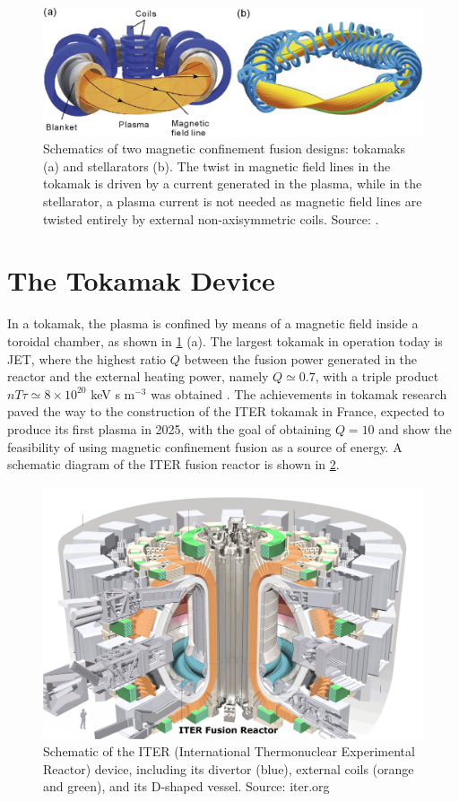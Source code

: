 \begin{figure}
    \centering
    \includegraphics[width=.99\textwidth]{images/tokamak_stellarator.jpg}
    \caption{Schematics of two magnetic confinement fusion designs: tokamaks (a) and stellarators (b). The twist in magnetic field lines in the tokamak is driven by a current generated in the plasma, while in the stellarator, a plasma current is not needed as magnetic field lines are twisted entirely by external non-axisymmetric coils. Source: \citep{Xu2016}.}
    \label{fig:toroidaldevice}
\end{figure}

\section{The Tokamak Device}

In a tokamak, the plasma is confined by means of a magnetic field inside a toroidal chamber, as shown in \cref{fig:toroidaldevice} (a).
%
The largest tokamak in operation today is JET, where the highest ratio $Q$ between the fusion power generated in the reactor and the external heating power, namely $Q \simeq 0.7$, with a triple product $n T \tau \simeq 8 \times 10^{20}$ keV s m${^{-3}}$ was obtained \citep{Jacquinot2010}.
%
The achievements in tokamak research paved the way to the construction of the ITER tokamak in France, expected to produce its first plasma in 2025, with the goal of obtaining $Q=10$ \citep{Aymar2002} and show the feasibility of using magnetic confinement fusion as a  source of energy.
%
A schematic diagram of the ITER fusion reactor is shown in \cref{fig:iter}.
%
\begin{figure}
    \centering
    \includegraphics[width=.75\textwidth]{images/iter.jpg}
    \caption{Schematic of the ITER (International Thermonuclear Experimental Reactor) device, including its divertor (blue), external coils (orange and green), and its D-shaped vessel. Source: iter.org}
    \label{fig:iter}
\end{figure}

